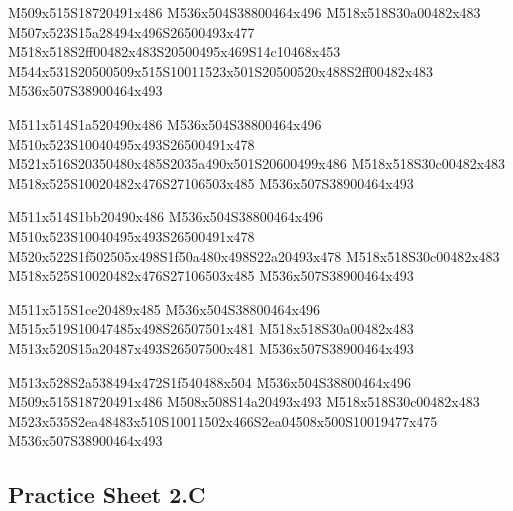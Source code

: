 \documentclass{article}
\begin{document}
\begin{multicols}{5}
\begin{center}
M509x515S18720491x486 %
M536x504S38800464x496 %
M518x518S30a00482x483 %
M507x523S15a28494x496S26500493x477 %
M518x518S2ff00482x483S20500495x469S14c10468x453 %
M544x531S20500509x515S10011523x501S20500520x488S2ff00482x483 %
M536x507S38900464x493 %
\vfil
\columnbreak

M511x514S1a520490x486 %
M536x504S38800464x496 %
M510x523S10040495x493S26500491x478 %
M521x516S20350480x485S2035a490x501S20600499x486 %
M518x518S30c00482x483 %
M518x525S10020482x476S27106503x485 %
M536x507S38900464x493 %
\vfil
\columnbreak

M511x514S1bb20490x486 %
M536x504S38800464x496 %
M510x523S10040495x493S26500491x478 %
M520x522S1f502505x498S1f50a480x498S22a20493x478 %
M518x518S30c00482x483 %
M518x525S10020482x476S27106503x485 %
M536x507S38900464x493 %
\vfil
\columnbreak

M511x515S1ce20489x485 %
M536x504S38800464x496 %
M515x519S10047485x498S26507501x481 %
M518x518S30a00482x483 %
M513x520S15a20487x493S26507500x481 %
M536x507S38900464x493 %
\vfil
\columnbreak

M513x528S2a538494x472S1f540488x504 %
M536x504S38800464x496 %
M509x515S18720491x486 %
M508x508S14a20493x493 %
M518x518S30c00482x483 %
M523x535S2ea48483x510S10011502x466S2ea04508x500S10019477x475 %
M536x507S38900464x493 %
\vfil

\end{center}
\end{multicols}

\subsection{Practice Sheet 2.C}
\end{document}
